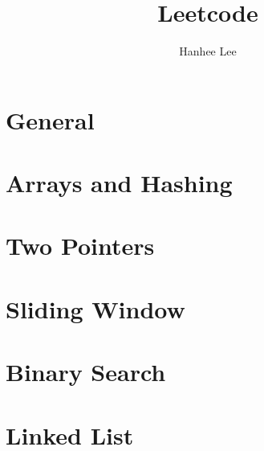 \documentclass{article}
\title{Leetcode}
\author{Hanhee Lee}
\begin{document}
\section{General}

\newpage

\section{Arrays and Hashing}

\newpage


\section{Two Pointers}

\newpage

\section{Sliding Window}

\newpage

\section{Binary Search}

\newpage

\section{Linked List}

\end{document}
